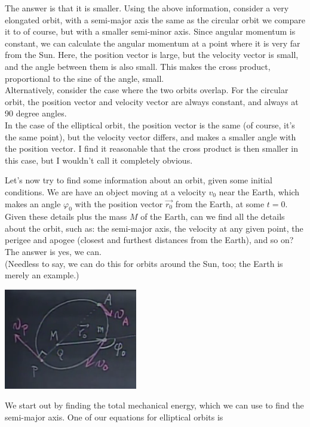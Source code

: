 \documentclass[8.01x]{subfiles}
\begin{document}
The answer is that it is smaller. Using the above information, consider a very elongated orbit, with a semi-major axis the same as the circular orbit we compare it to of course, but with a smaller semi-minor axis. Since angular momentum is constant, we can calculate the angular momentum at a point where it is very far from the Sun. Here, the position vector is large, but the velocity vector is small, and the angle between them is also small. This makes the cross product, proportional to the sine of the angle, small.\\
Alternatively, consider the case where the two orbits overlap. For the circular orbit, the position vector and velocity vector are always constant, and always at 90 degree angles.\\
In the case of the elliptical orbit, the position vector is the same (of course, it's the same point), but the velocity vector differs, and makes a smaller angle with the position vector. I find it reasonable that the cross product is then smaller in this case, but I wouldn't call it completely obvious.

Let's now try to find some information about an orbit, given some initial conditions. We are have an object moving at a velocity $v_0$ near the Earth, which makes an angle $\varphi_0$ with the position vector $\vec{r_0}$ from the Earth, at some $t = 0$. Given these details plus the mass $M$ of the Earth, can we find all the details about the orbit, such as: the semi-major axis, the velocity at any given point, the perigee and apogee (closest and furthest distances from the Earth), and so on? The answer is yes, we can.\\
(Needless to say, we can do this for orbits around the Sun, too; the Earth is merely an example.)

\begin{center}
\includegraphics[scale=0.6]{Graphics/lec22_initial_conditions}
\end{center}

We start out by finding the total mechanical energy, which we can use to find the semi-major axis. One of our equations for elliptical orbits is
\end{document}
